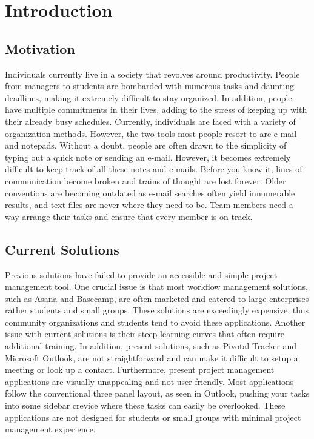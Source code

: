 \chapter{Introduction}

\section{Motivation}

Individuals currently live in a society that revolves around productivity. People from managers to students are bombarded with numerous tasks and daunting deadlines, making it extremely difficult to stay organized. In addition, people have multiple commitments in their lives, adding to the stress of keeping up with their already busy schedules. Currently, individuals are faced with a variety of organization methods. However, the two tools most people resort to are e-mail and notepads. Without a doubt, people are often drawn to the simplicity of typing out a quick note or sending an e-mail. However, it becomes extremely difficult to keep track of all these notes and e-mails. Before you know it, lines of communication become broken and trains of thought are lost forever. Older conventions are becoming outdated as e-mail searches often yield innumerable results, and text files are never where they need to be. Team members need a way arrange their tasks and ensure that every member is on track. 

\section{Current Solutions} 

Previous solutions have failed to provide an accessible and simple project management tool. One crucial issue is that most workflow management solutions, such as Asana and Basecamp, are often marketed and catered to large enterprises rather students and small groups. These solutions are exceedingly expensive, thus community organizations and students tend to avoid these applications. Another issue with current solutions is their steep learning curves that often require additional training. In addition, present solutions, such as Pivotal Tracker and Microsoft Outlook, are not straightforward and can make it difficult to setup a meeting or look up a contact. Furthermore, present project management applications are visually unappealing and not user-friendly. Most applications follow the conventional three panel layout, as seen in Outlook, pushing your tasks into some sidebar crevice where these tasks can easily be overlooked. These applications are not designed for students or small groups with minimal project management experience.

